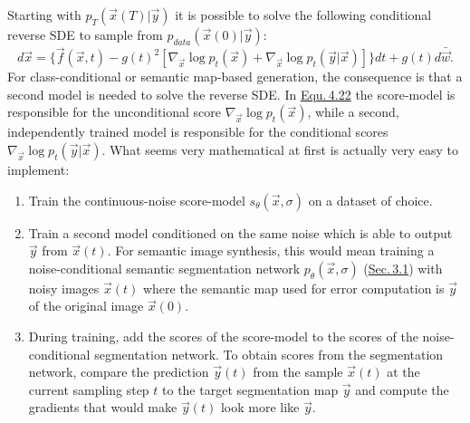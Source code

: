 Starting with $p_T(\vec{x}(T)|\vec{y})$ it is possible to solve the following conditional reverse SDE to sample from $p_{data}(\vec{x}(0)|\vec{y})$:
%
\begin{equation} \label{equ:4.22}
    d\vec{x}=\{\vec{f}(\vec{x},t)-g(t)^2[\nabla_{\vec{x}}\log p_t(\vec{x})+\nabla_{\vec{x}}\log p_t(\vec{y}|\vec{x})]\}dt+g(t)d\bar{\vec{w}}.
\end{equation}
%
For class-conditional or semantic map-based generation, the consequence is that a second model is needed to solve the reverse SDE. In \hyperref[equ:4.22]{Equ.\,4.22} the score-model is responsible for the unconditional score $\nabla_{\vec{x}}\log p_t(\vec{x})$, while a second, independently trained model is responsible for the conditional scores $\nabla_{\vec{x}}\log p_t(\vec{y}|\vec{x})$. What seems very mathematical at first is actually very easy to implement:
%
\begin{enumerate}
    \item Train the continuous-noise score-model $s_\theta(\vec{x},\sigma)$ on a dataset of choice.
    \item Train a second model conditioned on the same noise which is able to output $\vec{y}$ from $\vec{x}(t)$. For semantic image synthesis, this would mean training a noise-conditional semantic segmentation network $p_\theta(\vec{x}, \sigma)$ (\hyperref[sec:3.1]{Sec.\,3.1}) with noisy images $\vec{x}(t)$ where the semantic map used for error computation is $\vec{y}$ of the original image $\vec{x}(0)$.
    \item During training, add the scores of the score-model to the scores of the noise-conditional segmentation network. To obtain scores from the segmentation network, compare the prediction $\vec{y}(t)$ from the sample $\vec{x}(t)$ at the current sampling step $t$ to the target segmentation map $\vec{y}$ and compute the gradients that would make $\vec{y}(t)$ look more like $\vec{y}$.
\end{enumerate}


